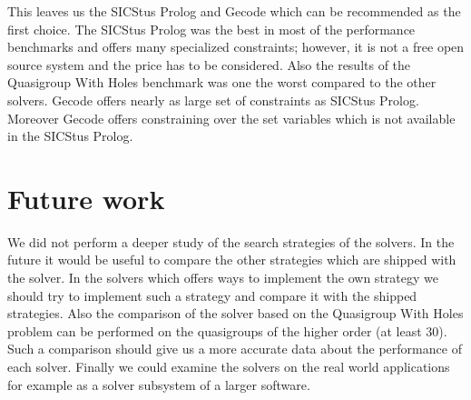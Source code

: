 This leaves us the SICStus Prolog and Gecode which can be recommended as the first
choice. The SICStus Prolog was the best in most of the performance benchmarks and offers 
many specialized constraints; however, it is not a free open source system and
the price has to be considered. Also the results of the Quasigroup With Holes benchmark
was one the worst compared to the other solvers. Gecode offers nearly as large set of constraints
as SICStus Prolog. Moreover Gecode offers constraining over the set variables which
is not available in the SICStus Prolog.

\section{Future work}
We did not perform a deeper study of the search strategies of
the solvers. In the future it would be useful to compare the other strategies which are shipped
with the solver. In the solvers which offers ways to implement the own strategy we 
should try to implement such a strategy and compare it with the shipped strategies.
Also the comparison of the solver based on the Quasigroup With Holes problem can
be performed on the quasigroups of the higher order (at least 30). Such a comparison 
should give us a more accurate data about the performance of each solver.
Finally we could examine the solvers on the real world applications for example
as a solver subsystem of a larger software. 